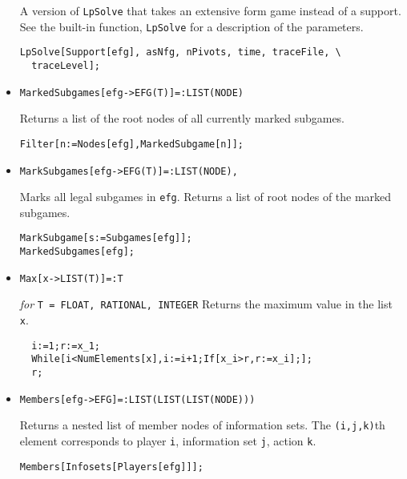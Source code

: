 \begin{itemize}
\bd 
A version of \verb+LpSolve+ that takes an extensive form
game instead of a support.  See the built-in function,
\verb+LpSolve+ for a description of the parameters.
\begin{verbatim}
LpSolve[Support[efg], asNfg, nPivots, time, traceFile, \
  traceLevel];
\end{verbatim} 
\ed

\item{}
\protect \large \begin{verbatim}
MarkedSubgames[efg->EFG(T)]=:LIST(NODE)
\end{verbatim}\normalsize

\bd 
Returns a list of the root nodes of all currently marked subgames.  
\begin{verbatim}
Filter[n:=Nodes[efg],MarkedSubgame[n]];
\end{verbatim} 
\ed

\item{}
\protect \large \begin{verbatim}
MarkSubgames[efg->EFG(T)]=:LIST(NODE),
\end{verbatim}\normalsize

\bd 
Marks all legal subgames in \verb+efg+.  Returns a list of root nodes
of the marked subgames.  
\begin{verbatim}
MarkSubgame[s:=Subgames[efg]];
MarkedSubgames[efg];
\end{verbatim} 
\ed

\item{}
\protect \large \begin{verbatim}
Max[x->LIST(T)]=:T
\end{verbatim}\normalsize

{\it for} {\tt T = FLOAT, RATIONAL, INTEGER}
\bd 
Returns the maximum value in the list \verb+x+.  
\begin{verbatim}
  i:=1;r:=x_1;
  While[i<NumElements[x],i:=i+1;If[x_i>r,r:=x_i];];
  r;
\end{verbatim} 
\ed


\item{}
\protect \large \begin{verbatim}
Members[efg->EFG]=:LIST(LIST(LIST(NODE)))
\end{verbatim}\normalsize

\bd 
Returns a nested list of member nodes of information sets.  The
\verb+(i,j,k)+th element corresponds to player \verb+i+, information
set \verb+j+, action \verb+k+.  
\begin{verbatim}
Members[Infosets[Players[efg]]];
\end{verbatim} 
\ed


\end{itemize}
